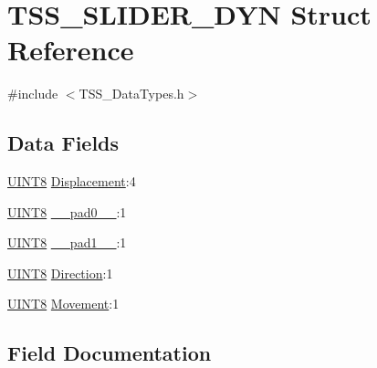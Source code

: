 \hypertarget{struct_t_s_s___s_l_i_d_e_r___d_y_n}{}\section{T\+S\+S\+\_\+\+S\+L\+I\+D\+E\+R\+\_\+\+D\+YN Struct Reference}
\label{struct_t_s_s___s_l_i_d_e_r___d_y_n}


{\ttfamily \#include $<$T\+S\+S\+\_\+\+Data\+Types.\+h$>$}

\subsection*{Data Fields}
\begin{DoxyCompactItemize}
\item 
\hyperlink{_t_s_s___data_types_8h_ab27e9918b538ce9d8ca692479b375b6a}{U\+I\+N\+T8} \hyperlink{struct_t_s_s___s_l_i_d_e_r___d_y_n_aeade839b12fc17a00b9836bf422184c6}{Displacement}\+:4
\item 
\hyperlink{_t_s_s___data_types_8h_ab27e9918b538ce9d8ca692479b375b6a}{U\+I\+N\+T8} \hyperlink{struct_t_s_s___s_l_i_d_e_r___d_y_n_a2ee36fe5d196fb00b71d0929ff19fe04}{\+\_\+\+\_\+pad0\+\_\+\+\_\+}\+:1
\item 
\hyperlink{_t_s_s___data_types_8h_ab27e9918b538ce9d8ca692479b375b6a}{U\+I\+N\+T8} \hyperlink{struct_t_s_s___s_l_i_d_e_r___d_y_n_a0eafaa7e9e186548dc46e1de54292c9a}{\+\_\+\+\_\+pad1\+\_\+\+\_\+}\+:1
\item 
\hyperlink{_t_s_s___data_types_8h_ab27e9918b538ce9d8ca692479b375b6a}{U\+I\+N\+T8} \hyperlink{struct_t_s_s___s_l_i_d_e_r___d_y_n_acf57d62841f58ca6bd206db2fc733fc0}{Direction}\+:1
\item 
\hyperlink{_t_s_s___data_types_8h_ab27e9918b538ce9d8ca692479b375b6a}{U\+I\+N\+T8} \hyperlink{struct_t_s_s___s_l_i_d_e_r___d_y_n_aa5fac4f9f3ed46d5688c0b547f0b757e}{Movement}\+:1
\end{DoxyCompactItemize}


\subsection{Field Documentation}
\mbox{\label{struct_t_s_s___s_l_i_d_e_r___d_y_n_a2ee36fe5d196fb00b71d0929ff19fe04}} 
